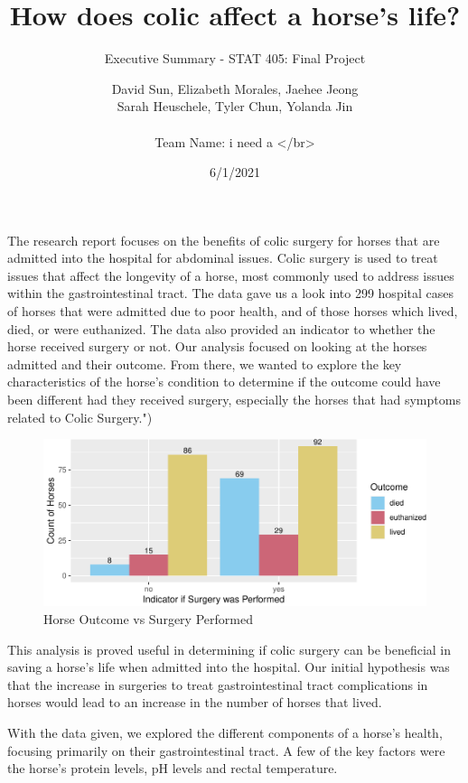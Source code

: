 \documentclass[
  12pt,
]{article}
\title{How does colic affect a horse's life?}
\subtitle{Executive Summary - STAT 405: Final Project}
\author{David Sun, Elizabeth Morales, Jaehee Jeong\\
Sarah Heuschele, Tyler Chun, Yolanda Jin\\
~\\
Team Name: i need a \textless/br\textgreater{}}
\date{6/1/2021}
\begin{document}
\maketitle

{
\setcounter{tocdepth}{2}
\tableofcontents
}
The research report focuses on the benefits of colic surgery for horses
that are admitted into the hospital for abdominal issues. Colic surgery
is used to treat issues that affect the longevity of a horse, most
commonly used to address issues within the gastrointestinal tract. The
data gave us a look into 299 hospital cases of horses that were admitted
due to poor health, and of those horses which lived, died, or were
euthanized. The data also provided an indicator to whether the horse
received surgery or not. Our analysis focused on looking at the horses
admitted and their outcome. From there, we wanted to explore the key
characteristics of the horse's condition to determine if the outcome
could have been different had they received surgery, especially the
horses that had symptoms related to Colic Surgery.")

\begin{figure}
\centering
\includegraphics{Final-Project---Executive-Summary_files/figure-latex/unnamed-chunk-4-1.pdf}
\caption{Horse Outcome vs Surgery Performed}
\end{figure}

This analysis is proved useful in determining if colic surgery can be
beneficial in saving a horse's life when admitted into the hospital. Our
initial hypothesis was that the increase in surgeries to treat
gastrointestinal tract complications in horses would lead to an increase
in the number of horses that lived.

With the data given, we explored the different components of a horse's
health, focusing primarily on their gastrointestinal tract. A few of the
key factors were the horse's protein levels, pH levels and rectal
temperature.
\end{document}
